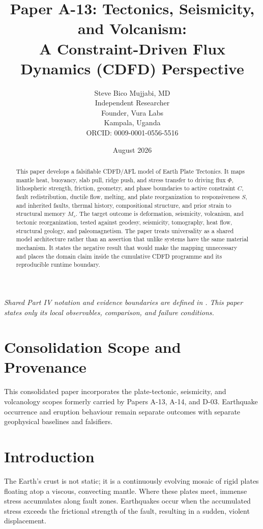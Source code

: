 \documentclass[11pt,a4paper]{article}
\title{\textbf{Paper A-13: Tectonics, Seismicity, and Volcanism:\\ A Constraint-Driven Flux Dynamics (CDFD) Perspective}}
\author{Steve Bico Mujjabi, MD\\
\small Independent Researcher\\
\small Founder, Vura Labs\\
\small Kampala, Uganda\\
\small ORCID: 0009-0001-0556-5516}
\date{August 2026}
\begin{document}
\maketitle

\noindent\textit{Shared Part IV notation and evidence boundaries are defined in . This paper states only its local observables, comparison, and failure conditions.}


\begin{abstract}
This paper develops a falsifiable CDFD/AFL model of Earth Plate Tectonics. It maps mantle heat, buoyancy, slab pull, ridge push, and stress transfer to driving flux $\Phi$, lithospheric strength, friction, geometry, and phase boundaries to active constraint $C$, fault redistribution, ductile flow, melting, and plate reorganization to responsiveness $S$, and inherited faults, thermal history, compositional structure, and prior strain to structural memory $M_s$. The target outcome is deformation, seismicity, volcanism, and tectonic reorganization, tested against geodesy, seismicity, tomography, heat flow, structural geology, and paleomagnetism. The paper treats universality as a shared model architecture rather than an assertion that unlike systems have the same material mechanism. It states the negative result that would make the mapping unnecessary and places the domain claim inside the cumulative CDFD programme and its reproducible runtime boundary.
\end{abstract}
\section*{Consolidation Scope and Provenance}
This consolidated paper incorporates the plate-tectonic, seismicity, and volcanology scopes formerly carried by Papers A-13, A-14, and D-03. Earthquake occurrence and eruption behaviour remain separate outcomes with separate geophysical baselines and falsifiers.


\section{Introduction}

The Earth's crust is not static; it is a continuously evolving mosaic of rigid plates floating atop a viscous, convecting mantle. Where these plates meet, immense stress accumulates along fault zones. Earthquakes occur when the accumulated stress exceeds the frictional strength of the fault, resulting in a sudden, violent displacement.
\end{document}

